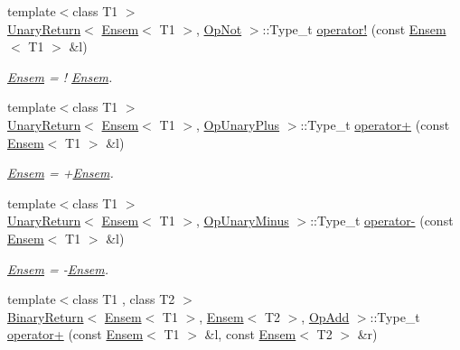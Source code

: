 \begin{DoxyCompactItemize}
{\footnotesize template$<$class T1 $>$ }\\\mbox{\hyperlink{structENSEM_1_1UnaryReturn}{Unary\+Return}}$<$ \mbox{\hyperlink{classENSEM_1_1Ensem}{Ensem}}$<$ T1 $>$, \mbox{\hyperlink{structENSEM_1_1OpNot}{Op\+Not}} $>$\+::Type\+\_\+t \mbox{\hyperlink{group__eensem_gad6dafbd7d34da088e6eaf463aa56e301}{operator!}} (const \mbox{\hyperlink{classENSEM_1_1Ensem}{Ensem}}$<$ T1 $>$ \&l)
\begin{DoxyCompactList}\small\item\em \mbox{\hyperlink{classENSEM_1_1Ensem}{Ensem}} = ! \mbox{\hyperlink{classENSEM_1_1Ensem}{Ensem}}. \end{DoxyCompactList}\item 
{\footnotesize template$<$class T1 $>$ }\\\mbox{\hyperlink{structENSEM_1_1UnaryReturn}{Unary\+Return}}$<$ \mbox{\hyperlink{classENSEM_1_1Ensem}{Ensem}}$<$ T1 $>$, \mbox{\hyperlink{structENSEM_1_1OpUnaryPlus}{Op\+Unary\+Plus}} $>$\+::Type\+\_\+t \mbox{\hyperlink{group__eensem_ga777c950dac5bc271c641c0f086f44ebf}{operator+}} (const \mbox{\hyperlink{classENSEM_1_1Ensem}{Ensem}}$<$ T1 $>$ \&l)
\begin{DoxyCompactList}\small\item\em \mbox{\hyperlink{classENSEM_1_1Ensem}{Ensem}} = +\mbox{\hyperlink{classENSEM_1_1Ensem}{Ensem}}. \end{DoxyCompactList}\item 
{\footnotesize template$<$class T1 $>$ }\\\mbox{\hyperlink{structENSEM_1_1UnaryReturn}{Unary\+Return}}$<$ \mbox{\hyperlink{classENSEM_1_1Ensem}{Ensem}}$<$ T1 $>$, \mbox{\hyperlink{structENSEM_1_1OpUnaryMinus}{Op\+Unary\+Minus}} $>$\+::Type\+\_\+t \mbox{\hyperlink{group__eensem_ga401760b4a9588007075073995611fa86}{operator-\/}} (const \mbox{\hyperlink{classENSEM_1_1Ensem}{Ensem}}$<$ T1 $>$ \&l)
\begin{DoxyCompactList}\small\item\em \mbox{\hyperlink{classENSEM_1_1Ensem}{Ensem}} = -\/\mbox{\hyperlink{classENSEM_1_1Ensem}{Ensem}}. \end{DoxyCompactList}\item 
{\footnotesize template$<$class T1 , class T2 $>$ }\\\mbox{\hyperlink{structENSEM_1_1BinaryReturn}{Binary\+Return}}$<$ \mbox{\hyperlink{classENSEM_1_1Ensem}{Ensem}}$<$ T1 $>$, \mbox{\hyperlink{classENSEM_1_1Ensem}{Ensem}}$<$ T2 $>$, \mbox{\hyperlink{structENSEM_1_1OpAdd}{Op\+Add}} $>$\+::Type\+\_\+t \mbox{\hyperlink{group__eensem_ga724a1c256d14ef567ac649b0ae8df485}{operator+}} (const \mbox{\hyperlink{classENSEM_1_1Ensem}{Ensem}}$<$ T1 $>$ \&l, const \mbox{\hyperlink{classENSEM_1_1Ensem}{Ensem}}$<$ T2 $>$ \&r)

\end{DoxyCompactItemize}
